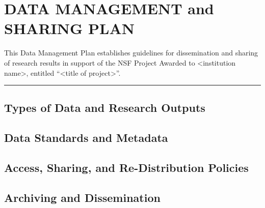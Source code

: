 \documentclass[../preamble.tex]{subfiles}
\begin{document}
\section{DATA MANAGEMENT and SHARING PLAN}

This Data Management Plan establishes guidelines for dissemination and sharing of research results in support of the NSF Project Awarded to <institution name>, entitled ``<title of project>''. 
\vpn\rule{\textwidth}{0.4pt}

\subsection{Types of Data and Research Outputs}

\subsection{Data Standards and Metadata}

\subsection{Access, Sharing, and Re-Distribution Policies}

\subsection{Archiving and Dissemination}
\end{document}
